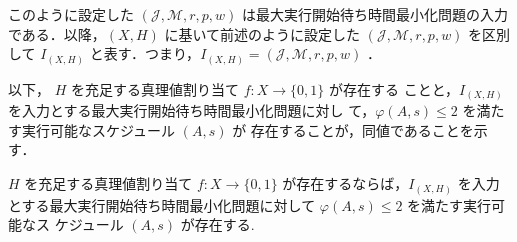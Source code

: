 \documentclass[12pt]{optlab-bachelor}
\begin{document}
このように設定した $(\mathcal{J}, \mathcal{M}, r, p, w)$ は最大実行開始待ち時間最小化問題の入力である．以降，$(X,H)$ に基いて前述のように設定した $(\mathcal{J}, \mathcal{M}, r, p, w)$ を区別して $I_{(X,H)}$ と表す．つまり，$I_{(X,H)} = (\mathcal{J}, \mathcal{M}, r, p, w)$ ．

以下， $H$ を充足する真理値割り当て $f : X \to \{0,1\}$ が存在する
ことと，$I_{(X,H)}$ を入力とする最大実行開始待ち時間最小化問題に対し
て，$\varphi(A,s) \le 2$ を満たす実行可能なスケジュール $(A,s)$ が
存在することが，同値であることを示す．

\begin{lemma}\label{l_6}
  $H$ を充足する真理値割り当て $f : X \to \{0,1\}$ が存在するならば，$I_{(X,H)}$ を入力とする最大実行開始待ち時間最小化問題に対して
  $\varphi(A,s) \le 2$ を満たす実行可能なス
  ケジュール $(A,s)$ が存在する.
\end{lemma}
\end{document}
